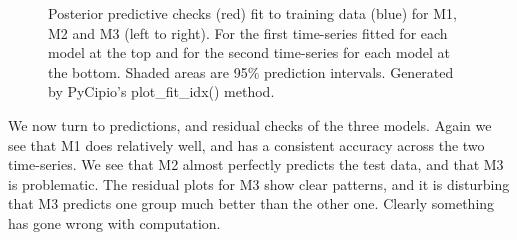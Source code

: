 \documentclass{article}
\begin{document}
\begin{figure}[ht]
    \centering
    \quad
    \quad
    \caption{Posterior predictive checks (red) fit to training data (blue) for M1, M2 and M3 (left to right). For the first time-series fitted for each model at the top and for the second time-series for each model at the bottom. Shaded areas are 95\% prediction intervals. Generated by PyCipio's plot\_fit\_idx() method. }
\end{figure}

We now turn to predictions, and residual checks of the three models. Again we see that M1 does relatively well, and has a consistent accuracy across the two time-series. We see that M2 almost perfectly predicts the test data, and that M3 is problematic. The residual plots for M3 show clear patterns, and it is disturbing that M3 predicts one group much better than the other one. Clearly something has gone wrong with computation.  
\end{document}
